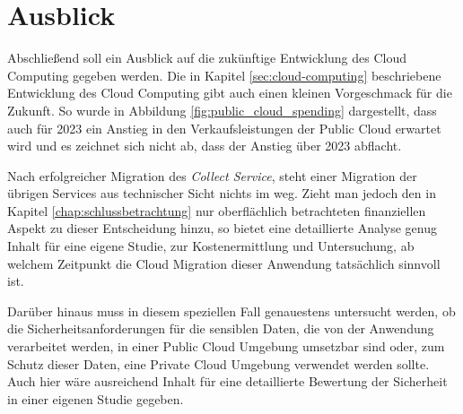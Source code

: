 \chapter{Ausblick}
Abschließend soll ein Ausblick auf die zukünftige Entwicklung des Cloud Computing gegeben werden. Die in Kapitel \ref{sec:cloud-computing} beschriebene Entwicklung des Cloud Computing gibt auch einen kleinen Vorgeschmack für die Zukunft. So wurde in Abbildung \ref{fig:public_cloud_spending} dargestellt, dass auch für 2023 ein Anstieg in den Verkaufsleistungen der Public Cloud erwartet wird und es zeichnet sich nicht ab, dass der Anstieg über 2023 abflacht.

Nach erfolgreicher Migration des \textit{Collect Service}, steht einer Migration der übrigen Services aus technischer Sicht nichts im weg. Zieht man jedoch den in Kapitel \ref{chap:schlussbetrachtung} nur oberflächlich betrachteten finanziellen Aspekt zu dieser Entscheidung hinzu, so bietet eine detaillierte Analyse genug Inhalt für eine eigene Studie, zur Kostenermittlung und Untersuchung, ab welchem Zeitpunkt die Cloud Migration dieser Anwendung tatsächlich sinnvoll ist.

Darüber hinaus muss in diesem speziellen Fall genauestens untersucht werden, ob die Sicherheitsanforderungen für die sensiblen Daten, die von der Anwendung verarbeitet werden, in einer Public Cloud Umgebung umsetzbar sind oder, zum Schutz dieser Daten, eine Private Cloud Umgebung verwendet werden sollte. Auch hier wäre ausreichend Inhalt für eine detaillierte Bewertung der Sicherheit in einer eigenen Studie gegeben.